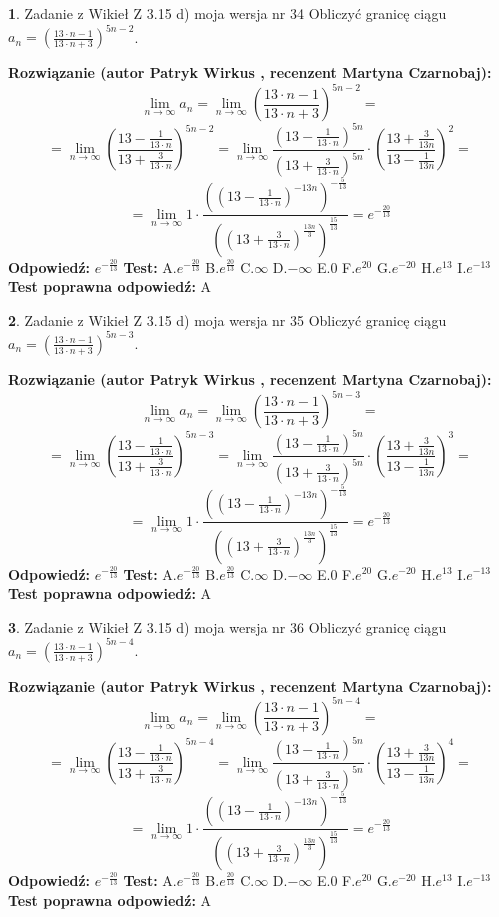 \documentclass[12pt, a4paper]{article}
\theoremstyle{definition} %
\newtheorem{zad}{}
\newcommand{\zadStart}[1]{\begin{zad}#1\newline}
\newcommand{\zadStop}{\end{zad}}
\newcommand{\rozwStart}[2]{\noindent \textbf{Rozwiązanie (autor #1 , recenzent #2): }\newline}
\newcommand{\rozwStop}{\newline}
\newcommand{\odpStart}{\noindent \textbf{Odpowiedź:}\newline}
\newcommand{\odpStop}{\newline}
\newcommand{\testStart}{\noindent \textbf{Test:}\newline}
\newcommand{\testStop}{\newline}
\newcommand{\kluczStart}{\noindent \textbf{Test poprawna odpowiedź:}\newline}
\newcommand{\kluczStop}{\newline}
\begin{document}
\zadStart{Zadanie z Wikieł Z 3.15 d) moja wersja nr 34}
Obliczyć granicę ciągu $a_{n}=(\frac{13\cdot n - 1}{13 \cdot n + 3})^{5n-2}$.
\zadStop
\rozwStart{Patryk Wirkus}{Martyna Czarnobaj}
$$\lim\limits_{n\to\infty} a_{n} = \lim\limits_{n\to\infty}(\frac{13\cdot n - 1}{13 \cdot n + 3})^{5n-2}=$$
$$=\lim\limits_{n\to\infty}(\frac{13 - \frac{1}{13\cdot n}}{13 + \frac{3}{13 \cdot n}})^{5n-2}=\lim\limits_{n\to\infty}\frac{(13 - \frac{1}{13\cdot n})^{5n}}{(13 + \frac{3}{13\cdot n})^{5n}} \cdot (\frac{13+\frac{3}{13n}}{13-\frac{1}{13n}})^{2}=$$
$$=\lim\limits_{n\to\infty} 1 \cdot \frac{((13-\frac{1}{13 \cdot n})^{-13n})^{-\frac{5}{13}}}{((13+\frac{3}{13 \cdot n})^{\frac{13n}{3}})^{\frac{15}{13}}} =e^{-\frac{20}{13}}$$
\rozwStop
\odpStart
$e^{-\frac{20}{13}}$
\odpStop
\testStart
A.$ e^{-\frac{20}{13}}$
B.$ e^{\frac{20}{13}}$
C.$\infty$
D.$-\infty$
E.$0$
F.$e^{20}$
G.$e^{-20}$
H.$e^{13}$
I.$e^{-13}$
\testStop
\kluczStart
A
\kluczStop



\zadStart{Zadanie z Wikieł Z 3.15 d) moja wersja nr 35}
Obliczyć granicę ciągu $a_{n}=(\frac{13\cdot n - 1}{13 \cdot n + 3})^{5n-3}$.
\zadStop
\rozwStart{Patryk Wirkus}{Martyna Czarnobaj}
$$\lim\limits_{n\to\infty} a_{n} = \lim\limits_{n\to\infty}(\frac{13\cdot n - 1}{13 \cdot n + 3})^{5n-3}=$$
$$=\lim\limits_{n\to\infty}(\frac{13 - \frac{1}{13\cdot n}}{13 + \frac{3}{13 \cdot n}})^{5n-3}=\lim\limits_{n\to\infty}\frac{(13 - \frac{1}{13\cdot n})^{5n}}{(13 + \frac{3}{13\cdot n})^{5n}} \cdot (\frac{13+\frac{3}{13n}}{13-\frac{1}{13n}})^{3}=$$
$$=\lim\limits_{n\to\infty} 1 \cdot \frac{((13-\frac{1}{13 \cdot n})^{-13n})^{-\frac{5}{13}}}{((13+\frac{3}{13 \cdot n})^{\frac{13n}{3}})^{\frac{15}{13}}} =e^{-\frac{20}{13}}$$
\rozwStop
\odpStart
$e^{-\frac{20}{13}}$
\odpStop
\testStart
A.$ e^{-\frac{20}{13}}$
B.$ e^{\frac{20}{13}}$
C.$\infty$
D.$-\infty$
E.$0$
F.$e^{20}$
G.$e^{-20}$
H.$e^{13}$
I.$e^{-13}$
\testStop
\kluczStart
A
\kluczStop



\zadStart{Zadanie z Wikieł Z 3.15 d) moja wersja nr 36}
Obliczyć granicę ciągu $a_{n}=(\frac{13\cdot n - 1}{13 \cdot n + 3})^{5n-4}$.
\zadStop
\rozwStart{Patryk Wirkus}{Martyna Czarnobaj}
$$\lim\limits_{n\to\infty} a_{n} = \lim\limits_{n\to\infty}(\frac{13\cdot n - 1}{13 \cdot n + 3})^{5n-4}=$$
$$=\lim\limits_{n\to\infty}(\frac{13 - \frac{1}{13\cdot n}}{13 + \frac{3}{13 \cdot n}})^{5n-4}=\lim\limits_{n\to\infty}\frac{(13 - \frac{1}{13\cdot n})^{5n}}{(13 + \frac{3}{13\cdot n})^{5n}} \cdot (\frac{13+\frac{3}{13n}}{13-\frac{1}{13n}})^{4}=$$
$$=\lim\limits_{n\to\infty} 1 \cdot \frac{((13-\frac{1}{13 \cdot n})^{-13n})^{-\frac{5}{13}}}{((13+\frac{3}{13 \cdot n})^{\frac{13n}{3}})^{\frac{15}{13}}} =e^{-\frac{20}{13}}$$
\rozwStop
\odpStart
$e^{-\frac{20}{13}}$
\odpStop
\testStart
A.$ e^{-\frac{20}{13}}$
B.$ e^{\frac{20}{13}}$
C.$\infty$
D.$-\infty$
E.$0$
F.$e^{20}$
G.$e^{-20}$
H.$e^{13}$
I.$e^{-13}$
\testStop
\kluczStart
A
\kluczStop
\end{document}
